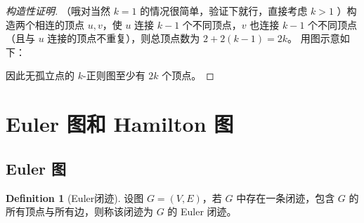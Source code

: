 \documentclass[oneside]{book}
\theoremstyle{definition}
\newtheorem{definition}{Definition}[section]
\begin{document}
\begin{proof}[构造性证明]
	（哦对当然 \(k=1\) 的情况很简单，验证下就行，直接考虑 \(k>1\) ）构造两个相连的顶点 \( u, v \)，使 \( u \) 连接 \( k-1 \) 个不同顶点，\( v \) 也连接 \( k-1 \) 个不同顶点（且与 \( u \) 连接的顶点不重复），则总顶点数为 \( 2 + 2(k-1) = 2k \)。
	用图示意如下：

\begin{center}
\end{center}

	因此无孤立点的 \( k \)-正则图至少有 \( 2k \) 个顶点。
\end{proof}


\section{Euler 图和 Hamilton 图}

\subsection{Euler 图}
\begin{definition}[Euler闭迹]
	设图 \( G = (V, E) \)，若 \( G \) 中存在一条闭迹，包含 \( G \) 的所有顶点与所有边，则称该闭迹为 \( G \) 的 Euler 闭迹。
\end{definition}
\end{document}

